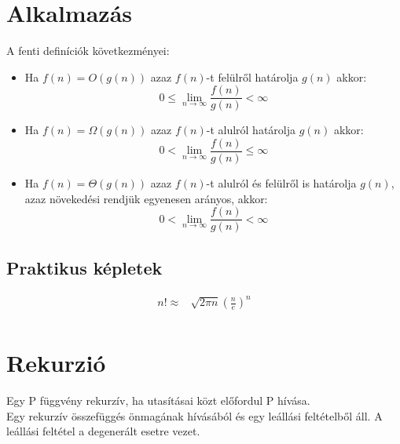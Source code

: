 \documentclass{article}
\theoremstyle{mytheoremstyle}
\theoremstyle{mytheoremstyle}
\theoremstyle{myproblemstyle}
\begin{document}
\section{Alkalmazás}
A fenti definíciók következményei:
\begin{itemize}
    \item 
    Ha $f(n) = O(g(n))$ azaz $f(n)$-t felülről határolja $g(n)$ akkor:
    \[0\leq \lim_{n\to\infty}\frac{f(n)}{g(n)}<\infty\]
    \item 
    Ha $f(n) = \Omega(g(n))$ azaz $f(n)$-t alulról határolja $g(n)$ akkor:
    \[0<\lim_{n\to\infty}\frac{f(n)}{g(n)}\leq \infty\]
    \item 
    Ha $f(n) = \Theta(g(n))$ azaz $f(n)$-t alulról és felülről is határolja $g(n)$, 
    azaz növekedési rendjük egyenesen arányos, akkor:
    \[0<\lim_{n\to\infty}\frac{f(n)}{g(n)}<\infty\]
\end{itemize}

\subsection{Praktikus képletek}
\begin{align*}
    n!\approx & \sqrt{2\pi n} { \left( \frac{n}{e} \right) }^n\\
\end{align*}

\section{Rekurzió}
Egy P függvény rekurzív, ha utasításai közt előfordul P hívása.\\
Egy rekurzív összefüggés önmagának hívásából és egy 
leállási feltételből áll. A leállási feltétel a degenerált 
esetre vezet.   
\end{document}
